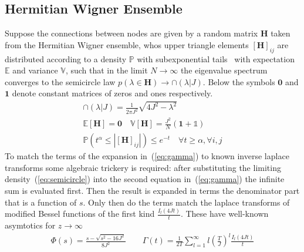 \documentclass{article}[12pt]
\numberwithin{equation}{section}
\begin{document}
\subsection{Hermitian Wigner Ensemble}
Suppose the connections between nodes are given by a random matrix
$\mathbf{H}$ taken from the Hermitian Wigner ensemble, whos upper triangle elements
$[\mathbf{H}]_{ij}$ are distributed according to a density $\mathbb{P}$ with
subexponential tails~\cite{} with expectation $\mathbb{E}$ and variance
$\mathbb{V}$, such that in the limit $N\rightarrow\infty$ the eigenvalue
spectrum converges to the semicircle law $p(\lambda\in\mathbf{H})\rightarrow\cap(\lambda|J)$.
Below the symbols $\mathbf{0}$ and $\mathbf{1}$ denote constant matrices of zeros and ones
respectively.
\begin{align}
\cap(\lambda|J)=\frac{1}{2\pi J^2}\sqrt{4J^2-\lambda^2}\label{eq:semicircle}
\quad\quad\\
\mathbb{E}[\mathbf{H}]=\mathbf{0}
\quad
\mathbb{V}[\mathbf{H}]=\frac{J^2}{N}(\mathbf{1}+\mathbb{1})
\quad\\
\mathbb{P}\left(
t^\alpha\leq
\left|[\mathbf{H}]_{ij}\right|
\right)\leq e^{-t}
\quad
\forall t\geq\alpha,\forall i,j
\end{align}
To match the terms of the expansion in~(\ref{eq:gamma}) to known inverse laplace
transforms some algebraic trickery is required: after substituting the limiting
density~(\ref{eq:semicircle}) into the second equation in~(\ref{eq:gamma}) the
infinite sum is evaluated first. Then the result is expanded in terms the denominator
part that is a function of $s$. Only then do the terms match the laplace transforms
of modified Bessel functions of the first kind $\frac{I_{l}(4Jt)}{t}$.
These have well-known asymtotics for $z\rightarrow\infty$
\begin{align}
  \Phi(s)=\frac{s-\sqrt{s^2-16J^2}}{8J^2}\qquad
  \Gamma(t)=\frac{1}{2T}
  \sum_{l=1}^{\infty}l\left(\frac{T}{J}\right)^{l}\frac{I_{l}(4Jt)}{t}
\end{align}
\pagebreak
\end{document}
